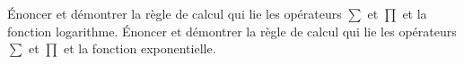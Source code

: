 %
%
	\begin{tasks}
		\task Énoncer et démontrer la règle de calcul qui lie les opérateurs $\sum$  et $\prod$  et la fonction logarithme.
		\task Énoncer et démontrer la règle de calcul qui lie les opérateurs $\sum$  et $\prod$  et la fonction exponentielle.
	\end{tasks}
